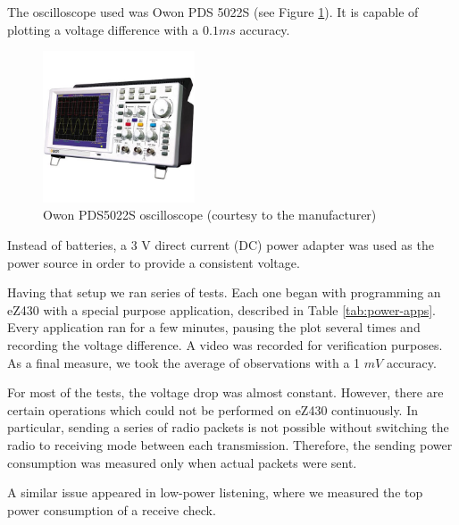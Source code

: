 The oscilloscope used was Owon PDS 5022S (see Figure \ref{fig:owon}).
It is capable of plotting a voltage difference with a $ 0.1 ms$ accuracy.

\begin{figure}[h]
  \centering
  \includegraphics[width=0.4\textwidth]{img/owon_pds5022s.jpg}
  \caption{Owon PDS5022S oscilloscope (courtesy to the manufacturer)}
  \label{fig:owon}
\end{figure}

Instead of batteries, a 3 V direct current (DC) power adapter was used as the power source in order to provide a consistent voltage.

Having that setup we ran series of tests.
Each one began with programming an eZ430 with a special purpose application, described in Table \ref{tab:power-apps}.
Every application ran for a few minutes, pausing the plot several times and recording the voltage difference.
A video was recorded for verification purposes.
As a final measure, we took the average of observations with a 1 $ mV $ accuracy.

For most of the tests, the voltage drop was almost constant.
However, there are certain operations which could not be performed on eZ430 continuously.
In particular, sending a series of radio packets is not possible without switching the radio to receiving mode between each transmission.
Therefore, the sending power consumption was measured only when actual packets were sent.

A similar issue appeared in low-power listening, where we measured the top power consumption of a receive check.


